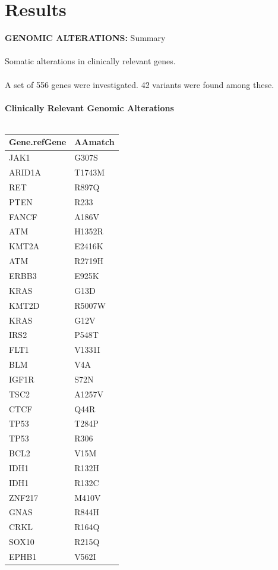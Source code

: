 \documentclass[12pt,a4paper]{article}\usepackage[]{graphicx}\usepackage[]{color}
\begin{document}
\section*{Results}
\textbf{GENOMIC ALTERATIONS:} Summary \\
 \\
Somatic alterations in clinically relevant genes. \\
 \\
A set of  556 genes were investigated.  42  variants were found among these.\\
 \\
\textbf{Clinically Relevant Genomic Alterations} \\
 \\
\begingroup\footnotesize
\begin{longtable}{ll}
  \hline
Gene.refGene & AAmatch \\ 
  \hline
JAK1 & G307S \\ 
  ARID1A & T1743M \\ 
  RET & R897Q \\ 
  PTEN & R233 \\ 
  FANCF & A186V \\ 
  ATM & H1352R \\ 
  KMT2A & E2416K \\ 
  ATM & R2719H \\ 
  ERBB3 & E925K \\ 
  KRAS & G13D \\ 
  KMT2D & R5007W \\ 
  KRAS & G12V \\ 
  IRS2 & P548T \\ 
  FLT1 & V1331I \\ 
  BLM & V4A \\ 
  IGF1R & S72N \\ 
  TSC2 & A1257V \\ 
  CTCF & Q44R \\ 
  TP53 & T284P \\ 
  TP53 & R306 \\ 
  BCL2 & V15M \\ 
  IDH1 & R132H \\ 
  IDH1 & R132C \\ 
  ZNF217 & M410V \\ 
  GNAS & R844H \\ 
  CRKL & R164Q \\ 
  SOX10 & R215Q \\ 
  EPHB1 & V562I \\ 

\end{longtable}
\end{document}
